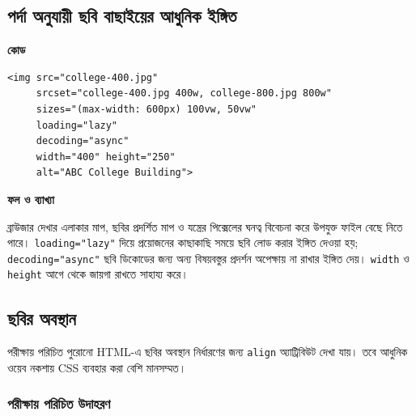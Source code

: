 \subsection{পর্দা অনুযায়ী ছবি বাছাইয়ের আধুনিক ইঙ্গিত}

\par\noindent
\begin{minipage}[t]{.54\linewidth}\vspace{0pt}\small
\textbf{\color{chFourTeal}কোড}\par
\begin{verbatim}
<img src="college-400.jpg"
     srcset="college-400.jpg 400w, college-800.jpg 800w"
     sizes="(max-width: 600px) 100vw, 50vw"
     loading="lazy"
     decoding="async"
     width="400" height="250"
     alt="ABC College Building">
\end{verbatim}

\par\smallskip
\end{minipage}\hfill
\begin{minipage}[t]{.42\linewidth}\vspace{0pt}\small
\textbf{\color{chFourTeal}ফল ও ব্যাখ্যা}\par
ব্রাউজার দেখার এলাকার মাপ, ছবির প্রদর্শিত মাপ ও যন্ত্রের পিক্সেলের ঘনত্ব বিবেচনা করে উপযুক্ত ফাইল বেছে নিতে পারে। \texttt{loading="lazy"} দিয়ে প্রয়োজনের কাছাকাছি সময়ে ছবি লোড করার ইঙ্গিত দেওয়া হয়; \texttt{decoding="async"} ছবি ডিকোডের জন্য অন্য বিষয়বস্তুর প্রদর্শন অপেক্ষায় না রাখার ইঙ্গিত দেয়। \texttt{width} ও \texttt{height} আগে থেকে জায়গা রাখতে সাহায্য করে।
\par\smallskip
\end{minipage}\par


\subsection{ছবির অবস্থান}

পরীক্ষায় পরিচিত পুরোনো HTML-এ ছবির অবস্থান নির্ধারণের জন্য \texttt{align} অ্যাট্রিবিউট দেখা যায়। তবে আধুনিক ওয়েব নকশায় CSS ব্যবহার করা বেশি মানসম্মত।




\subsubsection{পরীক্ষায় পরিচিত উদাহরণ}

